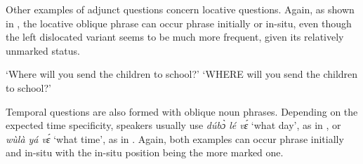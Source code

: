 
Other examples of adjunct questions concern locative questions. Again, as shown in , the locative oblique phrase can occur phrase initially or in-situ, even though the left dislocated variant seems to be much more frequent, given its relatively unmarked status.

\ea\label{QLOC}
    \trans `Where will you send the children to school?'
    \trans `WHERE will you send the children to school?'
\z
\z

Temporal questions are also formed with oblique noun phrases. Depending on the expected time specificity, speakers usually use {\itshape dúbɔ̀ lé vɛ́} `what day', as in , or {\itshape wùlà yá vɛ́} `what time', as in . Again, both examples can occur phrase initially and in-situ with the in-situ position being the more marked one.


